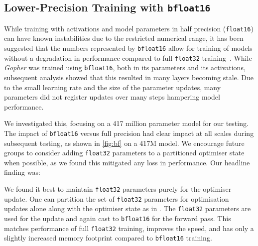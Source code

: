 \documentclass[11pt, a4paper, logo, internal, copyright, nonumbering]{deepmind}
\newenvironment{indentchunk}[1]%
 {\begin{list}{}%
         {\setlength{\leftmargin}{#1}}%
         \item[]%
 }
 {\end{list}}
\newcommand{\gopher}{\textit{Gopher}\xspace}
\begin{document}
\subsection{Lower-Precision Training with \texttt{bfloat16}}
While training with activations and model parameters in half precision (\texttt{float16}) can have known instabilities due to the restricted numerical range, it has been suggested that the numbers represented by \texttt{bfloat16} allow for training of models without a degradation in performance compared to full \texttt{float32} training~\citep{burgess2019bfloat16}. 
While \gopher was trained using \texttt{bfloat16}, both in its parameters and its activations, subsequent analysis showed that this resulted in many layers becoming stale.
Due to the small learning rate and the size of the parameter updates, many parameters did not register updates over many steps hampering model performance.

We investigated this, focusing on a 417 million parameter model for our testing.
The impact of \texttt{bfloat16} versus full precision had clear impact at all scales during subsequent testing, as shown in \autoref{fig:bf} on a 417M model.
We encourage future groups to consider adding \texttt{float32} parameters to a partitioned optimiser state when possible, as we found this mitigated any loss in performance.
Our headline finding was:

\begin{indentchunk}{1cm}
We found it best to maintain \texttt{float32} parameters purely for the optimiser update. One can partition the set of \texttt{float32} parameters for optimisation updates alone along with the optimiser state as in \citet{rajbhandari2020zero}.
The \texttt{float32} parameters are used for the update and again cast to \texttt{bfloat16} for the forward pass. This matches performance of full \texttt{float32} training, improves the speed, and has only a slightly increased memory footprint compared to \texttt{bfloat16} training.
\end{indentchunk}
\end{document}
